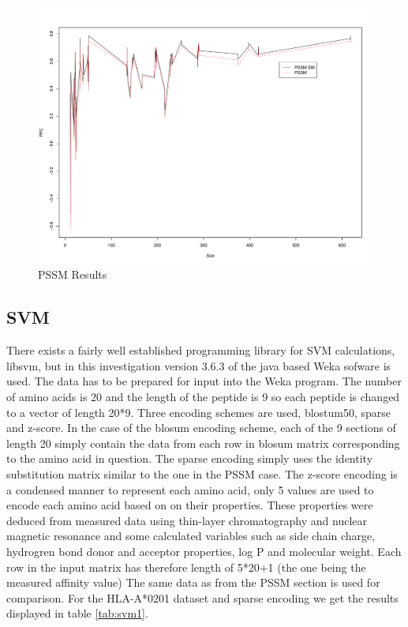 \begin{figure}
\begin{center}
\includegraphics[width=12cm]{fig/pssm1.pdf}
\caption{PSSM Results}\label{fig:pssm1}
\end{center}
\end{figure}

\subsection*{SVM}
There exists a fairly well established programming library for SVM calculations, libsvm, but in this investigation version 3.6.3 of the java based Weka sofware is used. 
The data has to be prepared for input into the Weka program.
The number of amino acids is 20 and the length of the peptide is 9 so each peptide is changed to a vector of length 20*9. 
Three encoding schemes are used, blostum50, sparse and z-score. 
In the case of the blosum encoding scheme, each of the 9 sections of length 20 simply contain the data from each row in blosum matrix corresponding to the amino acid in question.
The sparse encoding simply uses the identity substitution matrix similar to the one in the PSSM case. 
The z-score encoding is a condensed manner to represent each amino acid, only 5 values are used to encode each amino acid based on on their properties. 
These properties were deduced from measured data using thin-layer chromatography and nuclear magnetic resonance and some calculated variables 
such as side chain charge, hydrogren bond donor and acceptor properties, log P and molecular weight. 
Each row in the input matrix has therefore length of 5*20+1 (the one being the measured affinity value)
The same data as from the PSSM section is used for comparison. For the HLA-A*0201 dataset and sparse encoding we get the results displayed in table \ref{tab:svm1}.

